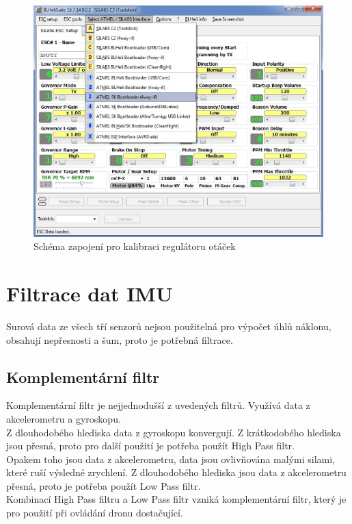\begin{figure}[h]
	\centering
	\includegraphics[width=12cm]{pictures/esc_calib3.jpg}
	\caption{Schéma zapojení pro kalibraci regulátoru otáček}
\end{figure}

\section{Filtrace dat IMU}

%
%


Surová data ze všech tří senzorů nejsou použitelná pro výpočet úhlů náklonu, obsahují nepřesnosti a šum, proto je potřebná filtrace.\\


\subsection{Komplementární filtr}
Komplementární filtr je nejjednodušší z uvedených filtrů. Využívá data z akcelerometru a gyroskopu. \\
Z dlouhodobého hlediska data z gyroskopu konvergují. Z krátkodobého hlediska jsou přesná, proto pro další použití je potřeba použít High Pass filtr.\\
Opakem toho jsou data z akcelerometru, data jsou ovlivňována malými silami, které ruší výsledné zrychlení. Z dlouhodobého hlediska jsou data z akcelerometru přesná, proto je potřeba použít Low Pass filtr.\\
Kombinací High Pass filtru a Low Pass filtr vzniká komplementární filtr, který je pro použití při ovládání dronu dostačující.\\


